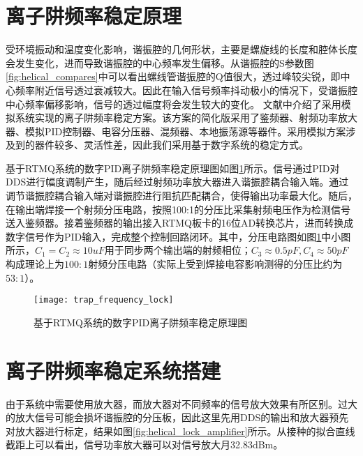 


\section[离子阱频率稳定原理]{离子阱频率稳定原理}
受环境振动和温度变化影响，谐振腔的几何形状，主要是螺旋线的长度和腔体长度会发生变化，进而导致谐振腔的中心频率发生偏移。从谐振腔的S参数图\ref{fig:helical_compares}中可以看出螺线管谐振腔的Q值很大，透过峰较尖锐，即中心频率附近信号透过衰减较大。因此在输入信号频率抖动极小的情况下，受谐振腔中心频率偏移影响，信号的透过幅度将会发生较大的变化。
文献\cite[]{Johnson_Wong_Campos_Restelli_Landsman_Neyenhuis_Mizrahi_Monroe_2016}中介绍了采用模拟系统实现的离子阱频率稳定方案。该方案的简化版采用了鉴频器、射频功率放大器、模拟PID控制器、电容分压器、混频器、本地振荡源等器件。采用模拟方案涉及到的器件较多、灵活性差，因此我们采用基于数字系统的稳定方式。

基于RTMQ系统的数字PID离子阱频率稳定原理图如图\ref{fig:trap_frequency_lock}所示。信号通过PID对DDS进行幅度调制产生，随后经过射频功率放大器进入谐振腔耦合输入端。通过调节谐振腔耦合输入端对谐振腔进行阻抗匹配耦合，使得输出功率最大化。随后，在输出端焊接一个射频分压电路，按照100:1的分压比采集射频电压作为检测信号送入鉴频器。接着鉴频器的输出接入RTMQ板卡的16位AD转换芯片，进而转换成数字信号作为PID输入，完成整个控制回路闭环。其中，分压电路图如图\ref{fig:trap_frequency_lock}中小图所示，$C_1=C_2\approx10uF$用于同步两个输出端的射频相位；$C_3\approx0.5pF, C_4\approx50pF$构成理论上为$100:1$射频分压电路（实际上受到焊接电容影响测得的分压比约为$53:1$）。

\begin{figure}
    \centering
    \caption[数字PID离子阱频率稳定原理图]{基于RTMQ系统的数字PID离子阱频率稳定原理图\label{fig:trap_frequency_lock}}
    \texttt{[image: trap\_frequency\_lock]}
\end{figure}


\section[离子阱频率稳定系统搭建]{离子阱频率稳定系统搭建}

由于系统中需要使用放大器，而放大器对不同频率的信号放大效果有所区别。过大的放大信号可能会损坏谐振腔的分压板，因此这里先用DDS的输出和放大器预先对放大器进行标定，结果如图\ref{fig:helical_lock_amplifier}所示。从接种的拟合直线截距上可以看出，信号功率放大器可以对信号放大月32.83dBm。

